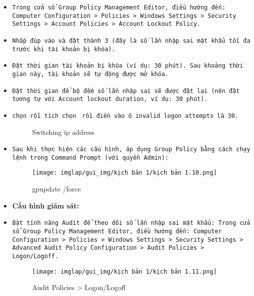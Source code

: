 \documentclass[13pt]{article}
\begin{document}
\begin{enumerate}
\begin{itemize}
\begin{itemize}
        \item \texttt{Trong cửa sổ Group Policy Management Editor, điều hướng đến: Computer Configuration > Policies > Windows Settings > Security Settings > Account Policies > Account Lockout Policy.}
        \item \textbf{}\texttt{Nhấp đúp vào và đặt thành 3 (đây là số lần nhập sai mật khẩu tối đa trước khi tài khoản bị khóa).}
        \item \textbf{}\texttt{Đặt thời gian tài khoản bị khóa (ví dụ: 30 phút). Sau khoảng thời gian này, tài khoản sẽ tự động được mở khóa.}
        \item \textbf{}\texttt{Đặt thời gian để bộ đếm số lần nhập sai sẽ được đặt lại (nên đặt tương tự với Account lockout duration, ví dụ: 30 phút).}
        \item \texttt{chọn }\textbf{}\texttt{rồi tích chọn} \textbf{}\texttt{ rồi điền vào ô invalid logon attempts là 30.}
        
        \begin{figure}[H]
 		\hfill
 		\hfill
 				\caption{Switching ip address}
 				\label{fig:AD_p2}
 		\end{figure}         
\newpage
        \item \texttt{Sau khi thực hiện các cấu hình, áp dụng Group Policy bằng cách chạy lệnh }\textbf{}\texttt{trong Command Prompt (với quyền Admin):}
   \begin{figure}[H]
       \centering
       \texttt{[image: imglap/gui\_img/kịch bản 1/kịch bản 1.10.png]}
       \caption{gpupdate /force}
       \label{fig:enter-label}
   \end{figure}

   \item \textbf{Cấu hình giám sát:}
    \item \texttt{Bật tính năng Audit để theo dõi số lần nhập sai mật khẩu:
    Trong cửa sổ Group Policy Management Editor, điều hướng đến: Computer Configuration > Policies > Windows Settings > Security Settings > Advanced Audit Policy Configuration > Audit Policies > Logon/Logoff.}
\begin{figure}[H]
    \centering
    \texttt{[image: imglap/gui\_img/kịch bản 1/kịch bản 1.11.png]}
    \caption{Audit Policies > Logon/Logoff}
    \label{fig:enter-label}
\end{figure}


\end{itemize}
\end{itemize}
\end{enumerate}
\end{document}
